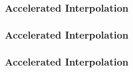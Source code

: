 \begin{frame}[t]
	\frametitle{Accelerated Interpolation}
	\resizebox{\textwidth}{!}{}
\end{frame}

\begin{frame}[t]	\frametitle{Accelerated Interpolation}
	\resizebox{0.5\textwidth}{!}{}
\end{frame}

\begin{frame}[t]
	\frametitle{Accelerated Interpolation}
	\begin{columns}
		\begin{column}{0.3\textwidth}
			\resizebox{0.8\textwidth}{!}{}
		\end{column}
		\begin{column}{0.55\textwidth}
			\onslide<2-5>
			\resizebox{0.4\textwidth}{!}{}
		\end{column}
	\end{columns}
\end{frame}

